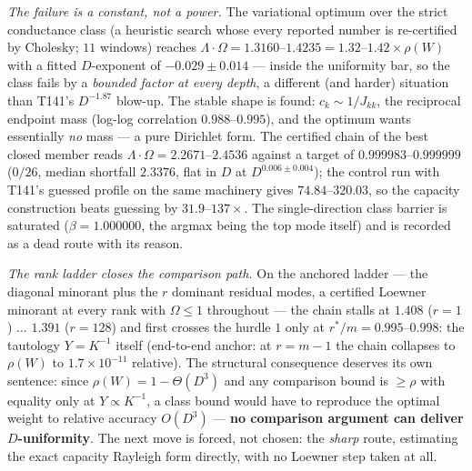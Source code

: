 \documentclass[11pt,a4paper]{article}
\begin{document}
\emph{The failure is a constant, not a power.} The variational optimum over the strict
conductance class (a heuristic search whose every reported number is re-certified by Cholesky;
$11$ windows) reaches $\Lambda\cdot\Omega=1.3160$--$1.4235=1.32$--$1.42\times\rho(W)$ with a
fitted $D$-exponent of $-0.029\pm0.014$ --- inside the uniformity bar, so the class fails by a
\emph{bounded factor at every depth}, a different (and harder) situation than T141's $D^{-1.87}$
blow-up. The stable shape is found: $c_k\sim1/J_{kk}$, the reciprocal endpoint mass (log-log
correlation $0.988$--$0.995$), and the optimum wants essentially \emph{no} mass --- a pure
Dirichlet form. The certified chain of the best closed member reads
$\Lambda\cdot\Omega=2.2671$--$2.4536$ against a target of $0.999983$--$0.999999$ ($0/26$, median
shortfall $2.3376$, flat in $D$ at $D^{0.006\pm0.004}$); the control run with T141's guessed
profile on the same machinery gives $74.84$--$320.03$, so the capacity construction beats
guessing by $31.9$--$137\times$. The single-direction class barrier is saturated
($\beta=1.000000$, the argmax being the top mode itself) and is recorded as a dead route with
its reason.

\emph{The rank ladder closes the comparison path.} On the anchored ladder --- the diagonal
minorant plus the $r$ dominant residual modes, a certified Loewner minorant at every rank with
$\Omega\le1$ throughout --- the chain stalls at $1.408$ ($r=1$) $\ldots$ $1.391$ ($r=128$) and
first crosses the hurdle $1$ only at $r^*/m=0.995$--$0.998$: the tautology $Y=K^{-1}$ itself
(end-to-end anchor: at $r=m-1$ the chain collapses to $\rho(W)$ to $1.7\times10^{-11}$
relative). The structural consequence deserves its own sentence: since $\rho(W)=1-\Theta(D^3)$
and any comparison bound is $\ge\rho$ with equality only at $Y\propto K^{-1}$, a class bound
would have to reproduce the optimal weight to relative accuracy $O(D^3)$ --- \textbf{no
comparison argument can deliver $D$-uniformity}. The next move is forced, not chosen: the
\emph{sharp} route, estimating the exact capacity Rayleigh form directly, with no Loewner step
taken at all.
\end{document}
